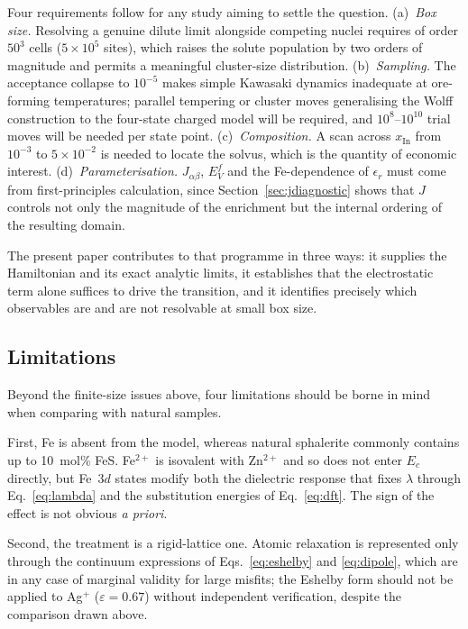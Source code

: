 \documentclass[11pt,a4paper]{article}
\begin{document}
Four requirements follow for any study aiming to settle the question.
(a)~\emph{Box size.} Resolving a genuine dilute limit alongside competing nuclei
requires of order $50^3$ cells ($5\times10^5$ sites), which raises the solute
population by two orders of magnitude and permits a meaningful cluster-size
distribution. (b)~\emph{Sampling.} The acceptance collapse to $10^{-5}$ makes
simple Kawasaki dynamics inadequate at ore-forming temperatures; parallel
tempering or cluster moves generalising the Wolff construction to the
four-state charged model will be required, and $10^8$--$10^{10}$ trial moves
will be needed per state point. (c)~\emph{Composition.} A scan across
$x_{\mathrm{In}}$ from $10^{-3}$ to $5\times10^{-2}$ is needed to locate the
solvus, which is the quantity of economic interest.
(d)~\emph{Parameterisation.} $J_{\alpha\beta}$, $E^f_V$ and the Fe-dependence of
$\epsilon_r$ must come from first-principles calculation, since
Section~\ref{sec:jdiagnostic} shows that $J$ controls not only the magnitude of
the enrichment but the internal ordering of the resulting domain.

The present paper contributes to that programme in three ways: it supplies the
Hamiltonian and its exact analytic limits, it establishes that the electrostatic
term alone suffices to drive the transition, and it identifies precisely which
observables are and are not resolvable at small box size.

\subsection{Limitations}

Beyond the finite-size issues above, four limitations should be borne in mind
when comparing with natural samples.

First, Fe is absent from the model, whereas natural sphalerite commonly contains
up to 10~mol\% FeS. Fe$^{2+}$ is isovalent with Zn$^{2+}$ and so does not enter
$E_c$ directly, but Fe~$3d$ states modify both the dielectric response that
fixes $\lambda$ through Eq.~\eqref{eq:lambda} and the substitution energies of
Eq.~\eqref{eq:dft}. The sign of the effect is not obvious \textit{a priori}.

Second, the treatment is a rigid-lattice one. Atomic relaxation is represented
only through the continuum expressions of Eqs.~\eqref{eq:eshelby} and
\eqref{eq:dipole}, which are in any case of marginal validity for large misfits;
the Eshelby form should not be applied to Ag$^+$ ($\varepsilon = 0.67$) without
independent verification, despite the comparison drawn above.
\end{document}
